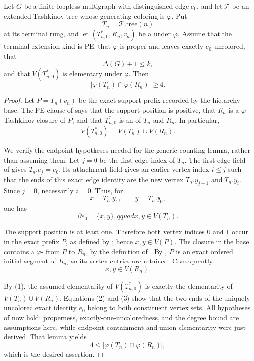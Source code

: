 \begin{lemma}
Let $G$ be a finite loopless multigraph with distinguished edge $e_0$,
and let $\mathcal T$ be an extended Tashkinov tree whose generating
coloring is $\varphi$.  Put
\[
                    T_n=\mathcal T.\mathrm{tree}(n)
\]
at its terminal rung, and let $(T_{n,0}^{*},R_n,v_n)$ be a
 under $\varphi$.  Assume that the terminal
extension kind is PE, that $\varphi$ is proper and leaves exactly $e_0$
uncolored, that
\[
                         \Delta(G)+1\leq k,
\]
and that $V(T_{n,0}^{*})$ is elementary under $\varphi$.  Then
\[
             \bigl|\overline\varphi(T_n)
                 \cap\overline\varphi(R_n)\bigr|\geq4.
\]
\end{lemma}
\begin{proof}
Let $P=T_n(v_n)$ be the exact support prefix recorded by the hierarchy
base.  The PE clause of  says that the support
position is positive, that $R_n$ is a $\varphi$-Tashkinov closure of
$P$, and that $T_{n,0}^{*}$ is an
 of $T_n$ and $R_n$.  In particular,
\[
                    V(T_{n,0}^{*})=V(T_n)\cup V(R_n).            \tag{1}
\]

We verify the endpoint hypotheses needed for the generic counting
lemma, rather than assuming them.  Let $j=0$ be the first edge index of
$T_n$.  The first-edge field of  gives
$T_n.e_j=e_0$.  Its attachment field gives an earlier vertex index
$i\leq j$ such that the ends of this exact edge identity are the new
vertex $T_n.y_{j+1}$ and $T_n.y_i$.  Since $j=0$, necessarily $i=0$.
Thus, for
\[
                   x=T_n.y_1,\qquad y=T_n.y_0,
\]
one has
\[
                   \partial e_0=\{x,y\},qquad x,y\in V(T_n).   \tag{2}
\]

The support position is at least one.  Therefore both vertex indices
$0$ and $1$ occur in the exact prefix $P$, as defined by
; hence $x,y\in V(P)$.  The closure in the
base contains a
$\varphi$- from $P$ to $R_n$, by
the definition of .
By , $P$ is an
exact ordered initial segment of $R_n$, so its vertex entries are retained.
Consequently
\[
                              x,y\in V(R_n).                     \tag{3}
\]

By (1), the assumed elementarity of $V(T_{n,0}^{*})$ is exactly the
elementarity of $V(T_n)\cup V(R_n)$.  Equations (2) and (3) show that
the two ends of the uniquely uncolored exact identity $e_0$ belong to
both constituent vertex sets.  All hypotheses of
 now hold: properness,
exactly-one-uncoloredness, and the degree bound are assumptions here,
while endpoint containment and union elementarity were just derived.
That lemma yields
\[
             4\leq
             \bigl|\overline\varphi(T_n)
                 \cap\overline\varphi(R_n)\bigr|,
\]
which is the desired assertion.
\end{proof}
